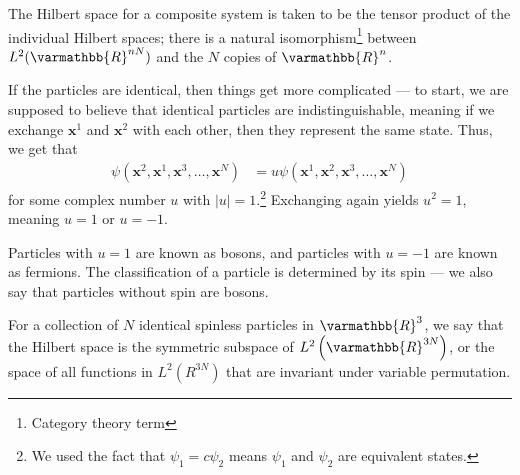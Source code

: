 \documentclass[12pt]{extarticle}
\newcommand{\R}{\varmathbb{R}}
\theoremstyle{plain}
\theoremstyle{definition}
\theoremstyle{remark}
\renewcommand{\newline}{\hfill\break}
\begin{document}
  The Hilbert space for a composite system is taken to be the tensor product of the individual Hilbert spaces; there is a natural isomorphism\footnote{Category theory term} between $L^{2}(\R^{nN})$ and the $N$ copies of $\R^n$.\newline

  If the particles are identical, then things get more complicated --- to start, we are supposed to believe that identical particles are indistinguishable, meaning if we exchange $\mathbf{x}^1$ and $\mathbf{x}^2$ with each other, then they represent the same state. Thus, we get that
  \begin{align*}
    \psi\left(\mathbf{x}^2,\mathbf{x}^1,\mathbf{x}^3,\dots,\mathbf{x}^N\right) &= u\psi \left(\mathbf{x}^1,\mathbf{x}^2,\mathbf{x}^3,\dots,\mathbf{x}^N\right)
  \end{align*}
  for some complex number $u$ with $|u| = 1$.\footnote{We used the fact that $\psi_1 = c\psi_2$ means $\psi_1$ and $\psi_2$ are equivalent states.} Exchanging again yields $u^2 = 1$, meaning $u = 1$ or $u = -1$.\newline

  Particles with $u = 1$ are known as bosons, and particles with $u = -1$ are known as fermions. The classification of a particle is determined by its spin --- we also say that particles without spin are bosons.\newline

  For a collection of $N$ identical spinless particles in $\R^{3}$, we say that the Hilbert space is the symmetric subspace of $L^{2}\left(\R^{3N}\right)$, or the space of all functions in $L^{2}\left(R^{3N}\right)$ that are invariant under variable permutation.
\end{document}
